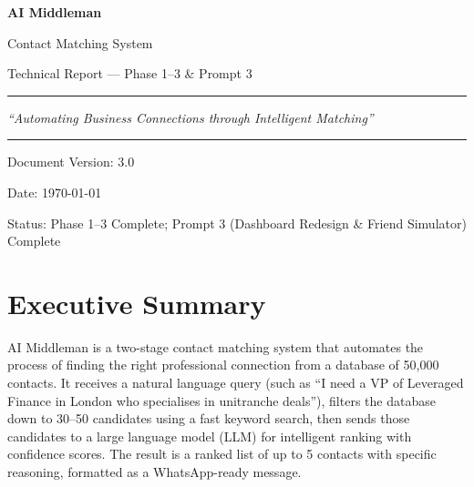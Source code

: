 \documentclass[12pt, a4paper]{report}
\begin{document}
\begin{titlepage}
    \centering
    \vspace*{2cm}
    {\Huge\bfseries AI Middleman\par}
    \vspace{0.5cm}
    {\Large Contact Matching System\par}
    \vspace{0.5cm}
    {\large Technical Report --- Phase 1--3 \& Prompt 3\par}
    \vspace{2cm}
    \rule{\textwidth}{0.5pt}
    \vspace{1cm}
    {\large\itshape ``Automating Business Connections through Intelligent Matching''\par}
    \vspace{1cm}
    \rule{\textwidth}{0.5pt}
    \vspace{2cm}
    {\large Document Version: 3.0\par}
    \vspace{0.3cm}
    {\large Date: \today\par}
    \vspace{0.3cm}
    {\large Status: Phase 1--3 Complete; Prompt 3 (Dashboard Redesign \& Friend Simulator) Complete\par}
    \vspace{3cm}
\end{titlepage}

\tableofcontents
\newpage

\chapter{Executive Summary}

AI Middleman is a two-stage contact matching system that automates the process of finding the right professional connection from a database of 50,000 contacts. It receives a natural language query (such as ``I need a VP of Leveraged Finance in London who specialises in unitranche deals''), filters the database down to 30--50 candidates using a fast keyword search, then sends those candidates to a large language model (LLM) for intelligent ranking with confidence scores. The result is a ranked list of up to 5 contacts with specific reasoning, formatted as a WhatsApp-ready message.
\end{document}
